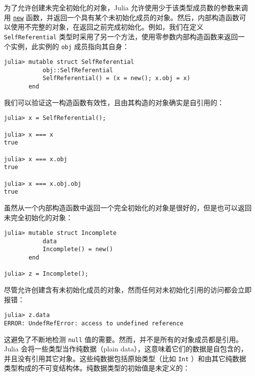 为了允许创建未完全初始化的对象，Julia 允许使用少于该类型成员数的参数来调用 \href{@ ref}{\texttt{new}} 函数，并返回一个具有某个未初始化成员的对象。然后，内部构造函数可以使用不完整的对象，在返回之前完成初始化。例如，我们在定义 \texttt{SelfReferential} 类型时采用了另一个方法，使用零参数内部构造函数来返回一个实例，此实例的 \texttt{obj} 成员指向其自身：




\begin{verbatim}
julia> mutable struct SelfReferential
           obj::SelfReferential
           SelfReferential() = (x = new(); x.obj = x)
       end

\end{verbatim}



我们可以验证这一构造函数有效性，且由其构造的对象确实是自引用的：




\begin{verbatim}
julia> x = SelfReferential();

julia> x === x
true

julia> x === x.obj
true

julia> x === x.obj.obj
true
\end{verbatim}



虽然从一个内部构造函数中返回一个完全初始化的对象是很好的，但是也可以返回未完全初始化的对象：




\begin{verbatim}
julia> mutable struct Incomplete
           data
           Incomplete() = new()
       end

julia> z = Incomplete();
\end{verbatim}



尽管允许创建含有未初始化成员的对象，然而任何对未初始化引用的访问都会立即报错：




\begin{verbatim}
julia> z.data
ERROR: UndefRefError: access to undefined reference
\end{verbatim}



这避免了不断地检测 \texttt{null} 值的需要。然而，并不是所有的对象成员都是引用。Julia 会将一些类型当作纯数据（{\textquotedbl}plain data{\textquotedbl}），这意味着它们的数据是自包含的，并且没有引用其它对象。这些纯数据包括原始类型（比如 \texttt{Int} ）和由其它纯数据类型构成的不可变结构体。纯数据类型的初始值是未定义的：




